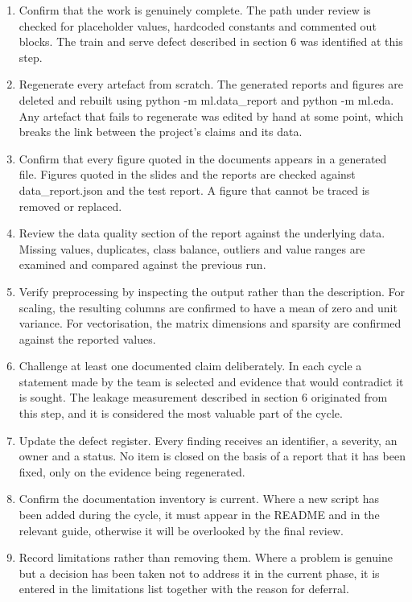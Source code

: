 \documentclass[11pt,a4paper]{article}
\begin{document}
\begin{enumerate}[leftmargin=*,itemsep=2pt]
  \item Confirm that the work is genuinely complete. The path under review is checked for placeholder values, hardcoded constants and commented out blocks. The train and serve defect described in section 6 was identified at this step.
  \item Regenerate every artefact from scratch. The generated reports and figures are deleted and rebuilt using python -m ml.data\_report and python -m ml.eda. Any artefact that fails to regenerate was edited by hand at some point, which breaks the link between the project's claims and its data.
  \item Confirm that every figure quoted in the documents appears in a generated file. Figures quoted in the slides and the reports are checked against data\_report.json and the test report. A figure that cannot be traced is removed or replaced.
  \item Review the data quality section of the report against the underlying data. Missing values, duplicates, class balance, outliers and value ranges are examined and compared against the previous run.
  \item Verify preprocessing by inspecting the output rather than the description. For scaling, the resulting columns are confirmed to have a mean of zero and unit variance. For vectorisation, the matrix dimensions and sparsity are confirmed against the reported values.
  \item Challenge at least one documented claim deliberately. In each cycle a statement made by the team is selected and evidence that would contradict it is sought. The leakage measurement described in section 6 originated from this step, and it is considered the most valuable part of the cycle.
  \item Update the defect register. Every finding receives an identifier, a severity, an owner and a status. No item is closed on the basis of a report that it has been fixed, only on the evidence being regenerated.
  \item Confirm the documentation inventory is current. Where a new script has been added during the cycle, it must appear in the README and in the relevant guide, otherwise it will be overlooked by the final review.
  \item Record limitations rather than removing them. Where a problem is genuine but a decision has been taken not to address it in the current phase, it is entered in the limitations list together with the reason for deferral.
\end{enumerate}
\end{document}
